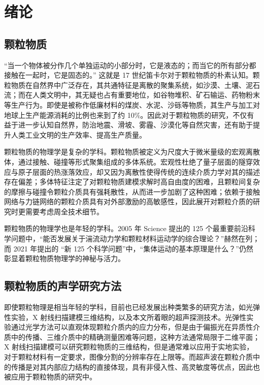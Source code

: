 
\chapter{绪论}

\section{颗粒物质}

“当一个物体被分作几个单独运动的小部分时，它是液态的；而当它的所有部分都接触在一起时，它是固态的。” 这就是 17 世纪笛卡尔对于颗粒物质的朴素认知。颗粒物质在自然界中广泛存在，其共通特征是离散的聚集系统，如沙漠、土壤、泥石流；而在人类文明中，其无疑也占有重要地位，如谷物堆积、矿石输运、药物粉末等生产行为。即使是被称作低廉材料的煤炭、水泥、沙砾等物质，其生产与加工对地球上生产能源消耗的比例也来到了约 \num{10}\%\cite{duran2000sands}。因此对于颗粒物质的研究，不仅有益于进一步认知自然界，防治地震、滑坡、雾霾、沙漠化等自然灾害，还有助于提升人类工业文明的生产效率、提高生产质量。

颗粒物质的物理学是复杂的学科。颗粒物质被定义为尺度大于微米量级的宏观离散体，通过接触、碰撞等形式聚集组成的多体系统。宏观性杜绝了量子层面的隧穿效应与原子层面的热涨落效应，却又因为离散性使得传统的连续介质力学对其的描述存在偏差\cite{RevModPhys.71.435}；多体特征注定了对颗粒物质建模求解时高自由度的困难，且颗粒间复杂的摩擦与碰撞令颗粒介质具有强耗散性，从而进一步加剧了这种困难；依赖于接触网络与力链网络的颗粒介质具有对外部激励的高敏感性，因此展开对颗粒介质的研究时更需要考虑周全技术细节。

颗粒物质的物理学也是年轻的学科。2005 年 Science 提出的 125 个最重要前沿科学问题\cite{doi:10.1126/science.309.5731.78b}中，“能否发展关于湍流动力学和颗粒材料运动学的综合理论？”赫然在列；而 2021 年提出的 “新 125 个科学问题”\cite{sanders2021125}中，“集体运动的基本原理是什么？”仍然彰显着颗粒物质物理学的神秘与活力。

\section{颗粒物质的声学研究方法}

即使颗粒物理是相当年轻的学科，目前也已经发展出种类繁多的研究方法，如光弹性实验\cite{photoelasticimetry}，X 射线扫描建模三维结构\cite{PhysRevE.68.020301}，以及本文所着眼的超声探测技术。光弹性实验通过光学方法可以直观体现颗粒介质内的应力分布，但是由于偏振光在异质性介质中的传播、三维介质中的精确测量困难等问题\cite{Non-Destructive_3D_Photoelasticity}，这种方法通常局限于二维平面；X 射线扫描建模可以研究颗粒物质的三维结构，但是通常难以应用于实地实验，对于颗粒材料有一定要求，图像分割的分辨率存在上限等。而超声波在颗粒介质中的传播是对其内部应力结构的直接体现，具有非侵入性、高灵敏度等优点，因此也被应用于颗粒物质的研究中。

